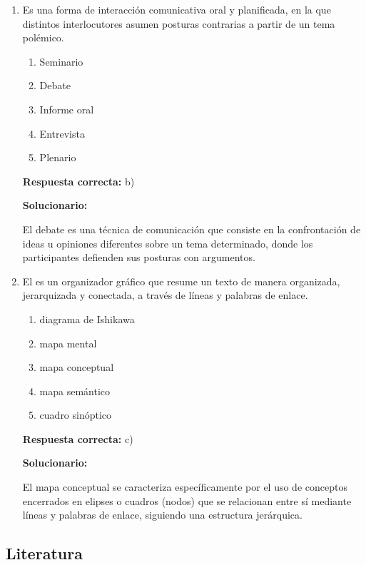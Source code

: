 \begin{enumerate}[resume]
	\item Es una forma de interacción comunicativa oral y planificada, en la que distintos interlocutores asumen posturas contrarias a partir de un tema polémico.
	\begin{enumerate}[label=\alph*)]
		\item Seminario
		\item Debate
		\item Informe oral
		\item Entrevista
		\item Plenario
	\end{enumerate}
	\textbf{Respuesta correcta:} b)

	\vspace{2mm}
	\textbf{Solucionario:}

	El debate es una técnica de comunicación que consiste en la confrontación de ideas u opiniones diferentes sobre un tema determinado, donde los participantes defienden sus posturas con argumentos.

	\vspace{6mm}

	\item El \underline{\hspace{3cm}} es un organizador gráfico que resume un texto de manera organizada, jerarquizada y conectada, a través de líneas y palabras de enlace.
	\begin{enumerate}[label=\alph*)]
		\item diagrama de Ishikawa
		\item mapa mental
		\item mapa conceptual
		\item mapa semántico
		\item cuadro sinóptico
	\end{enumerate}
	\textbf{Respuesta correcta:} c)

	\vspace{2mm}
	\textbf{Solucionario:}

	El mapa conceptual se caracteriza específicamente por el uso de conceptos encerrados en elipses o cuadros (nodos) que se relacionan entre sí mediante líneas y palabras de enlace, siguiendo una estructura jerárquica.

	\vspace{6mm}

\end{enumerate}


\subsection*{Literatura}

